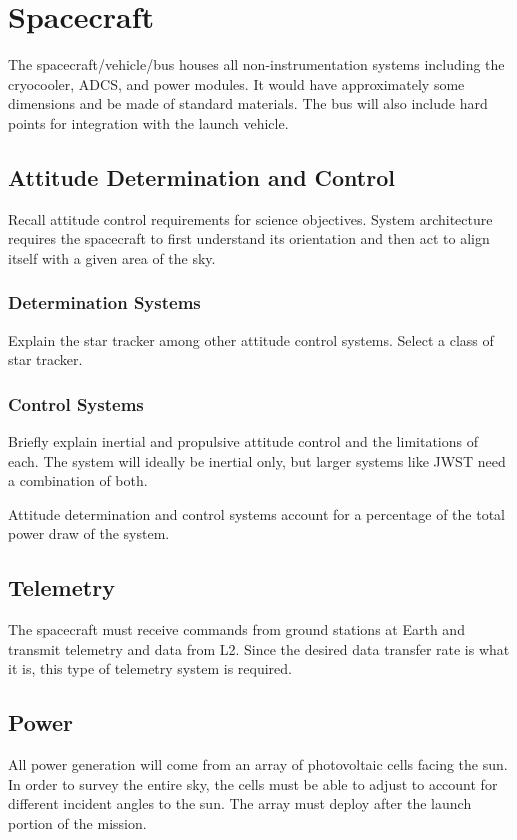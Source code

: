 \documentclass{ws-jai}
\begin{document}
\section{Spacecraft}
\label{S:spacecraft}
The spacecraft/vehicle/bus houses all non-instrumentation systems including the cryocooler, ADCS, and power modules. It would have approximately some dimensions and be made of standard materials. The bus will also include hard points for integration with the launch vehicle.

\subsection{Attitude Determination and Control}
\label{sS:adcs}
Recall attitude control requirements for science objectives. System architecture requires the spacecraft to first understand its orientation and then act to align itself with a given area of the sky.

\subsubsection{Determination Systems}
\label{ssS:determination}
Explain the star tracker among other attitude control systems. Select a class of star tracker.

\subsubsection{Control Systems}
\label{ssS:control}
Briefly explain inertial and propulsive attitude control and the limitations of each. The system will ideally be inertial only, but larger systems like JWST need a combination of both.

Attitude determination and control systems account for a percentage of the total power draw of the system.

\subsection{Telemetry}
\label{sS:telemetry}
The spacecraft must receive commands from ground stations at Earth and transmit telemetry and data from L2. Since the desired data transfer rate is what it is, this type of telemetry system is required.

\subsection{Power}
\label{sS:power}
All power generation will come from an array of photovoltaic cells facing the sun. In order to survey the entire sky, the cells must be able to adjust to account for different incident angles to the sun. The array must deploy after the launch portion of the mission.
\end{document}
